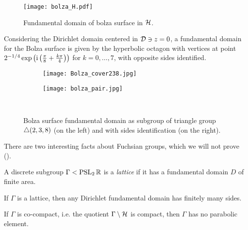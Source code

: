 \begin{figure}[H]
\centering
\texttt{[image: bolza\_H.pdf]}
  \noindent\\
  \decoRule
  \caption{Fundamental domain of bolza surface in $\mathcal{H}$.}
  \label{fig:fund_dom_bolza_h}
\end{figure}

Considering the Dirichlet domain centered in $\mathcal{D}\ni z=0$, a fundamental domain for the Bolza surface is given by the hyperbolic octagon with vertices at point $2^{-1/4}\exp\left(\mathrm{i}\left(\frac{\pi}{8}+\frac{k\pi}{4}\right)\right)$ for $k=0,\ldots,7$, with opposite sides identified.

\begin{figure}[H]
\centering
  \begin{subfigure}[b]{0.4\textwidth}
  \centering
    \texttt{[image: Bolza\_cover238.jpg]}
    \label{fig:bolza_238}
  \end{subfigure}
  \begin{subfigure}[b]{0.36\textwidth}
  \centering
    \texttt{[image: bolza\_pair.jpg]}
    \label{fig:sides_bolza}
  \end{subfigure}
  \noindent\\
  \decoRule
  \caption{Bolza surface fundamental domain as subgroup of triangle group $\bigtriangleup(2,3,8)$ (on the left) and with sides identification (on the right).}
  \label{fig:oval_card_orbits}
\end{figure}


There are two interesting facts about Fuchsian groups, which we will not prove (\cite{Katok:groups}).

\begin{defin}
\label{def:lattice}
A discrete subgroup $\Gamma<\operatorname{PSL}_{2}\mathbb{R}$ is a \emph{lattice} if it has a fundamental domain $D$ of finite area.
\end{defin}


\begin{nteo}[Siegel]
\label{teo:siegel}
If $\Gamma$ is a lattice, then any Dirichlet fundamental domain has finitely many sides.
\end{nteo}

\begin{nteo}
If $\Gamma$ is co-compact, i.e. the quotient $\Gamma\setminus\mathcal{H}$ is compact, then $\Gamma$ has no parabolic element.
\end{nteo}

